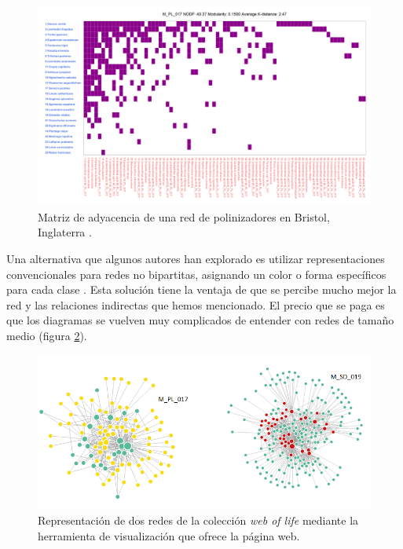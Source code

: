 \begin{figure}[ht!]
\centering
\includegraphics[scale=0.33]{Figures/VIS_M_PL_017_matrix.png}
\caption{Matriz de adyacencia de una red de polinizadores en Bristol, Inglaterra \cite{memmott1999structure}.}
\label{fig:VIS_matrix_PL_001}
\end{figure}

Una alternativa que algunos autores han explorado es utilizar representaciones convencionales para redes no bipartitas, asignando un color o forma específicos para cada clase \cite{mello2011missing,genini2010cheaters,toju2014assembly}. Esta solución tiene la ventaja de que se percibe mucho mejor la red y las relaciones indirectas que hemos mencionado. El precio que se paga es que los diagramas se vuelven muy complicados de entender con redes de tamaño medio (figura \ref{fig:VIS_grafos_weboflife}).

\begin{figure}[h!]
\centering
\includegraphics[scale=0.66]{Figures/VIS_grafos_weboflife.png}
\caption{Representación de dos redes de la colección \textit{web of  life} mediante la herramienta de visualización que ofrece la página web.}
\label{fig:VIS_grafos_weboflife}
\end{figure}

